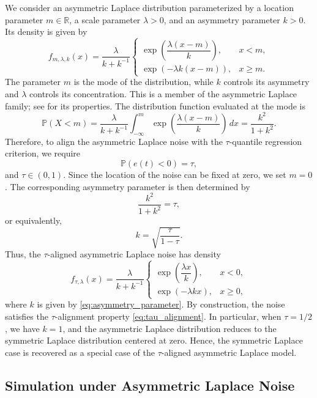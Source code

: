 \documentclass[12pt,a4paper]{article}
\begin{document}
We consider an asymmetric Laplace distribution parameterized by a location parameter
$m\in\mathbb{R}$, a scale parameter $\lambda>0$, and an asymmetry parameter
$k>0$. Its density is given by
\[
f_{m,\lambda,k}(x)
=
\frac{\lambda}{k+k^{-1}}
\begin{cases}
	\exp\left(\dfrac{\lambda(x-m)}{k}\right), & x<m, \\[8pt]
	\exp\left(-\lambda k(x-m)\right), & x\geq m.
\end{cases}
\]
The parameter $m$ is the mode of the distribution, while $k$ controls its
asymmetry and $\lambda$ controls its concentration.
This is a member of the asymmetric Laplace family; see
\citet{Kotz2001} for its properties.
The distribution function evaluated at the mode is
\[
\mathbb{P}(X<m)
=
\frac{\lambda}{k+k^{-1}}
\int_{-\infty}^{m}
\exp\left(\frac{\lambda(x-m)}{k}\right)\,dx
=
\frac{k^2}{1+k^2}.
\]
Therefore, to align the asymmetric Laplace noise with the $\tau$-quantile
regression criterion, we require
\begin{equation}
	\mathbb{P}(e(t)<0)=\tau,
	\label{eq:tau_alignment}
\end{equation}
and
\(
\tau\in(0,1).
\)
Since the location of the noise can be fixed at zero, we set $m=0$. The
corresponding asymmetry parameter is then determined by
\[
\frac{k^2}{1+k^2}=\tau,
\]
or equivalently,
\begin{equation}
	k
	=
	\sqrt{\frac{\tau}{1-\tau}}.
	\label{eq:asymmetry_parameter}
\end{equation}
Thus, the $\tau$-aligned asymmetric Laplace noise has density
\[
f_{\tau,\lambda}(x)
=
\frac{\lambda}{k+k^{-1}}
\begin{cases}
	\exp\left(\dfrac{\lambda x}{k}\right), & x<0, \\[8pt]
	\exp(-\lambda kx), & x\geq 0,
\end{cases}
\]
where $k$ is given by \eqref{eq:asymmetry_parameter}. 
By construction, the noise satisfies the $\tau$-alignment property
\eqref{eq:tau_alignment}.
In particular, when $\tau=1/2$, we have $k=1$, and the asymmetric Laplace
distribution reduces to the symmetric Laplace distribution centered at zero.
Hence, the symmetric Laplace case is recovered as a special case of the
$\tau$-aligned asymmetric Laplace model.

\subsection{Simulation under Asymmetric Laplace Noise}
\label{subsec:asymmetric_laplace_noise}
\end{document}
